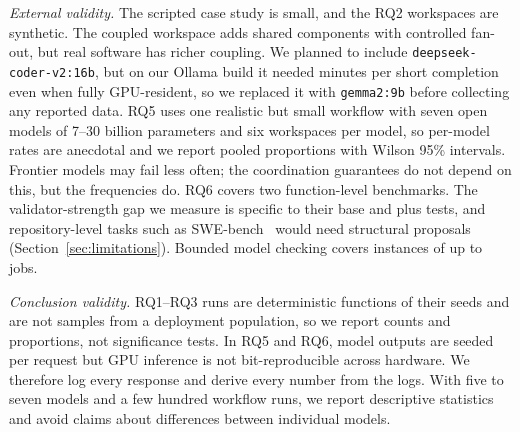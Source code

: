 \emph{External validity.} The scripted case study is small, and the RQ2 workspaces are synthetic. The coupled workspace adds shared components with controlled fan-out, but real software has richer coupling. We planned to include \texttt{deepseek-coder-v2:16b}, but on our Ollama build it needed minutes per short completion even when fully GPU-resident, so we replaced it with \texttt{gemma2:9b} before collecting any reported data. RQ5 uses one realistic but small workflow with seven open models of 7--30 billion parameters and six workspaces per model, so per-model rates are anecdotal and we report pooled proportions with Wilson 95\% intervals. Frontier models may fail less often; the coordination guarantees do not depend on this, but the frequencies do. RQ6 covers two function-level benchmarks. The validator-strength gap we measure is specific to their base and plus tests, and repository-level tasks such as SWE-bench~\cite{swebench} would need structural proposals (Section~\ref{sec:limitations}). Bounded model checking covers instances of up to \TLCExtMaxJobs{} jobs.

\emph{Conclusion validity.} RQ1--RQ3 runs are deterministic functions of their seeds and are not samples from a deployment population, so we report counts and proportions, not significance tests. In RQ5 and RQ6, model outputs are seeded per request but GPU inference is not bit-reproducible across hardware. We therefore log every response and derive every number from the logs. With five to seven models and a few hundred workflow runs, we report descriptive statistics and avoid claims about differences between individual models.
